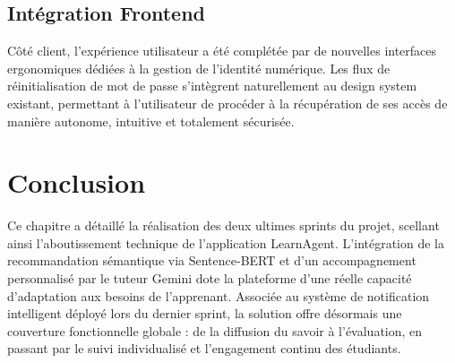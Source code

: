 \subsection{Intégration Frontend}

Côté client, l'expérience utilisateur a été complétée par de nouvelles interfaces ergonomiques dédiées à la gestion de l'identité numérique. Les flux de réinitialisation de mot de passe s'intègrent naturellement au design system existant, permettant à l'utilisateur de procéder à la récupération de ses accès de manière autonome, intuitive et totalement sécurisée.


\section*{Conclusion}

Ce chapitre a détaillé la réalisation des deux ultimes sprints du projet, scellant ainsi l'aboutissement technique de l'application LearnAgent. L'intégration de la recommandation sémantique via Sentence-BERT et d'un accompagnement personnalisé par le tuteur Gemini dote la plateforme d'une réelle capacité d'adaptation aux besoins de l'apprenant. Associée au système de notification intelligent déployé lors du dernier sprint, la solution offre désormais une couverture fonctionnelle globale : de la diffusion du savoir à l'évaluation, en passant par le suivi individualisé et l'engagement continu des étudiants.

